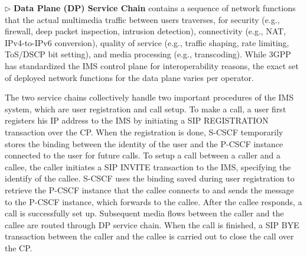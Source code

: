 $\triangleright$ \noindent\textbf{Data Plane (DP) Service Chain} contains a sequence of network functions that the actual multimedia traffic between users traverses, for security (e.g., firewall, deep packet inspection, intrusion detection), connectivity (e.g., NAT, IPv4-to-IPv6 conversion), quality of service (e.g., traffic shaping, rate limiting, ToS/DSCP bit setting), and media processing (e.g., transcoding). While 3GPP has standardized the IMS control plane for interoperability reasons, the exact set of deployed network functions for the data plane varies per operator.


The two service chains collectively handle two important procedures of the IMS system, which are user registration and call setup. %
To make a call, a user first registers his IP address to the IMS by initiating a SIP REGISTRATION transaction over the CP. When the registration is done, S-CSCF temporarily stores the binding between the identity of the user and the P-CSCF instance connected to the user for future calls. To setup a call between a caller and a callee, the caller initiates a SIP INVITE transaction to the IMS, specifying the identify of the callee. S-CSCF uses the binding saved during user registration to retrieve the P-CSCF instance that the callee connects to and sends the message to the P-CSCF instance, which forwards to the callee. After the callee responds, a call is successfully set up. Subsequent media flows between the caller and the callee are routed through DP service chain. When the call is finished, a SIP BYE transaction between the caller and the callee is carried out to close the call over the CP.

